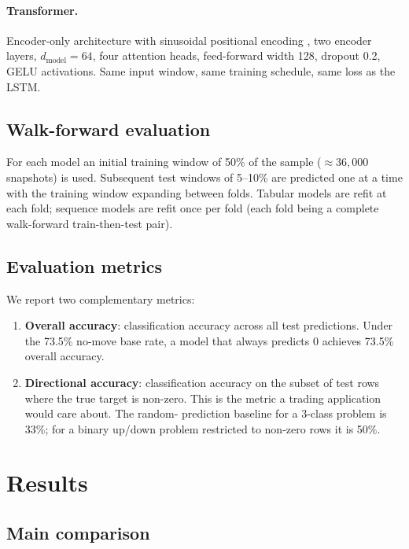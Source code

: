 \documentclass[11pt]{article}
\begin{document}
\paragraph{Transformer.} Encoder-only architecture with sinusoidal
positional encoding \citep{vaswani2017attention}, two encoder layers,
\(d_{\mathrm{model}}=64\), four attention heads, feed-forward width
128, dropout 0.2, GELU activations. Same input window, same training
schedule, same loss as the LSTM.

\subsection{Walk-forward evaluation}

For each model an initial training window of 50\% of the sample
(\(\approx 36{,}000\) snapshots) is used. Subsequent test windows of
5--10\% are predicted one at a time with the training window expanding
between folds. Tabular models are refit at each fold; sequence models
are refit once per fold (each fold being a complete walk-forward
train-then-test pair).

\subsection{Evaluation metrics}

We report two complementary metrics:

\begin{enumerate}
  \item \textbf{Overall accuracy}: classification accuracy across all
  test predictions. Under the 73.5\% no-move base rate, a model that
  always predicts \(0\) achieves 73.5\% overall accuracy.
  \item \textbf{Directional accuracy}: classification accuracy on
  the subset of test rows where the true target is non-zero. This
  is the metric a trading application would care about. The random-
  prediction baseline for a 3-class problem is 33\%; for a binary
  up/down problem restricted to non-zero rows it is 50\%.
\end{enumerate}

\section{Results}
\label{sec:results}

\subsection{Main comparison}
\end{document}
